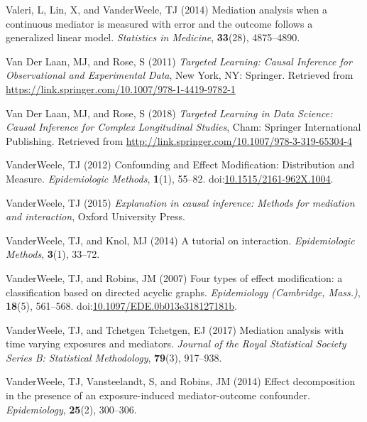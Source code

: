 \documentclass[
  single column]{article}
\newlength{\cslhangindent}
\newenvironment{CSLReferences}[2] %
 {\begin{list}{}{%
  \setlength{\itemindent}{0pt}
  \setlength{\leftmargin}{0pt}
  \setlength{\parsep}{0pt}
  \ifodd #1
   \setlength{\leftmargin}{\cslhangindent}
   \setlength{\itemindent}{-1\cslhangindent}
  \fi
  \setlength{\itemsep}{#2\baselineskip}}}
 {\end{list}}
\begin{document}
\begin{CSLReferences}{1}{0}
Valeri, L, Lin, X, and VanderWeele, TJ (2014) Mediation analysis when a
continuous mediator is measured with error and the outcome follows a
generalized linear model. \emph{Statistics in Medicine},
\textbf{33}(28), 4875--4890.

Van Der Laan, MJ, and Rose, S (2011) \emph{Targeted Learning: Causal
Inference for Observational and Experimental Data}, New York, NY:
Springer. Retrieved from
\url{https://link.springer.com/10.1007/978-1-4419-9782-1}

Van Der Laan, MJ, and Rose, S (2018) \emph{Targeted Learning in Data
Science: Causal Inference for Complex Longitudinal Studies}, Cham:
Springer International Publishing. Retrieved from
\url{http://link.springer.com/10.1007/978-3-319-65304-4}

VanderWeele, TJ (2012) Confounding and Effect Modification: Distribution
and Measure. \emph{Epidemiologic Methods}, \textbf{1}(1), 55--82.
doi:\href{https://doi.org/10.1515/2161-962X.1004}{10.1515/2161-962X.1004}.

VanderWeele, TJ (2015) \emph{Explanation in causal inference: Methods
for mediation and interaction}, Oxford University Press.

VanderWeele, TJ, and Knol, MJ (2014) A tutorial on interaction.
\emph{Epidemiologic Methods}, \textbf{3}(1), 33--72.

VanderWeele, TJ, and Robins, JM (2007) Four types of effect
modification: a classification based on directed acyclic graphs.
\emph{Epidemiology (Cambridge, Mass.)}, \textbf{18}(5), 561--568.
doi:\href{https://doi.org/10.1097/EDE.0b013e318127181b}{10.1097/EDE.0b013e318127181b}.

VanderWeele, TJ, and Tchetgen Tchetgen, EJ (2017) Mediation analysis
with time varying exposures and mediators. \emph{Journal of the Royal
Statistical Society Series B: Statistical Methodology}, \textbf{79}(3),
917--938.

VanderWeele, TJ, Vansteelandt, S, and Robins, JM (2014) Effect
decomposition in the presence of an exposure-induced mediator-outcome
confounder. \emph{Epidemiology}, \textbf{25}(2), 300--306.


\end{CSLReferences}
\end{document}
